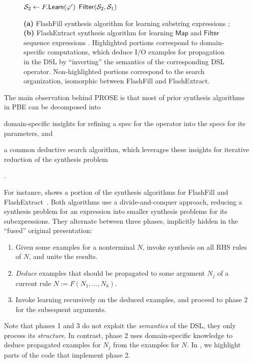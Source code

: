 \begin{figure}[p!]
\begin{fullpage}
\begin{algorithmic}
            \State $\mathcal{S}_2 \gets F.\mathsf{Learn}(\varphi')$
            \State \Return $\mathsf{Filter}(\mathcal{S}_2, \mathcal{S}_1)$
            \EndFunction
        \end{algorithmic}
        \vspace{3pt}
        \caption{\textbf{(a)} FlashFill synthesis algorithm for learning substring expressions \cite[Figure 7]{flashfill};
            \textbf{(b)} FlashExtract synthesis algorithm for learning $\mathsf{Map}$ and $\mathsf{Filter}$ sequence
            expressions \cite[Figure 6]{flashextract}.
            Highlighted portions correspond to domain-specific computations, which deduce I/O examples for propagation in
            the DSL by ``inverting'' the semantics of the corresponding DSL operator.
        Non-highlighted portions correspond to the search organization, isomorphic between FlashFill and FlashExtract.}
        \label{fig:prose:prior}
    \end{fullpage}
\end{figure}

The main observation behind PROSE is that most of prior synthesis algorithms in PBE can be decomposed into
\begin{enumerate*}[label=\textbf{(\alph*)}]
    \item domain-specific insights for refining a spec for the operator into the specs for its
        parameters, and
    \item a common deductive search algorithm, which leverages these insights for iterative reduction of the synthesis
        problem
\end{enumerate*}.

For instance,  shows a portion of the synthesis algorithms for FlashFill \cite[Figure
7]{flashfill} and FlashExtract~\cite[Figure 6]{flashextract}.
Both algorithms use a divide-and-conquer approach, reducing a synthesis problem for an expression into smaller synthesis
problems for its subexpressions.
They alternate between three phases, implicitly hidden in the ``fused'' original presentation:
\begin{enumerate}[nosep]
    \item Given some examples for a nonterminal $N$, invoke synthesis on all RHS rules of $N$, and unite the results.
    \item \emph{Deduce} examples that should be propagated to some argument $N_j$ of a current rule $N := F(N_1, \dots,
        N_k)$.
    \item Invoke learning recursively on the deduced examples, and proceed to phase 2 for the subsequent arguments.
\end{enumerate}
Note that phases 1 and 3 do not exploit the \emph{semantics} of the DSL, they only process its \emph{structure}.
In contrast, phase 2 uses domain-specific knowledge to deduce propagated examples for $N_j$ from the examples for $N$.
In , we highlight parts of the code that implement phase 2.

